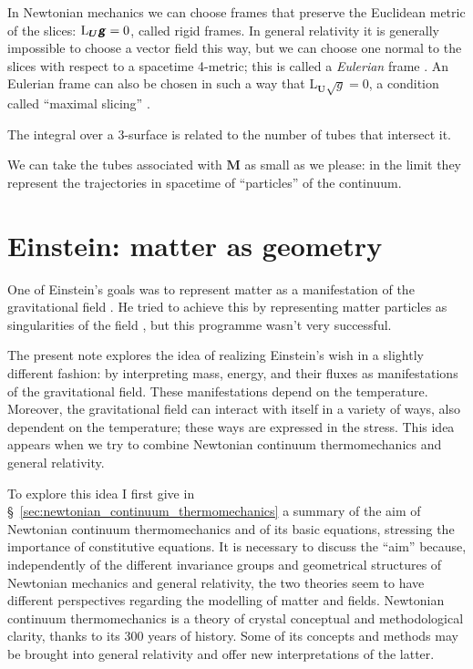 \documentclass[\ifafour a4paper,12pt,\else a5paper,10pt,\fi%
onecolumn,oneside,article,%
british%
]{memoir}
\theoremstyle{remark}
\theoremstyle{innote}
\newcommand*{\mathte}[1]{\textbf{\textit{\textsf{#1}}}}
\newcommand*{\citep}{\parencites}
\renewcommand*{\|}{\nonscript\,\vert\nonscript\;\mathopen{}}
\newcommand*{\sect}{\S}%
\newcommand*{\Li}{\mathrm{L}}
\newcommand*{\yrr}{M}
\newcommand*{\yr}{\bm{\yrr}}
\newcommand*{\yFF}{U}
\newcommand*{\yF}{\bm{\yFF}}
\newcommand*{\ygg}{g}
\newcommand*{\yg}{\mathte{\ygg}}
\newcommand*{\ygv}{\sqrt{\ygg}}
\begin{document}
\bigskip

In Newtonian mechanics we can choose frames that preserve the Euclidean
metric of the slices: $\Li_{\yF}\yg = 0$, called rigid frames. In general
relativity it is generally impossible to choose a vector field this way,
but we can choose one normal to the slices with respect to a spacetime
4-metric; this is called a \emph{Eulerian} frame
\citep{smarretal1978,smarretal1980}. An Eulerian frame can also be chosen in
such a way that $\Li_{\yF}\ygv=0$, a condition called \enquote{maximal
  slicing} \citep[\sect~III.B]{smarretal1978}.

The integral over a 3-surface is related
to the number of tubes that intersect it.

We can take the tubes associated with $\yr$ as small as we please: in the
limit they represent the trajectories in spacetime of \enquote{particles}
of the continuum.


\section{Einstein: matter as geometry}
\label{sec:einstein_matter_fields}

One of Einstein's goals was to represent matter as a manifestation of the
gravitational field \citep[see][]{havasetal1962,havas1967}. He tried to
achieve this by representing matter particles as singularities of the field
\citep{einsteinetal1938}, but this programme wasn't very successful.

The present note explores the idea of realizing Einstein's wish in a
slightly different fashion: by interpreting mass, energy, and their fluxes
as manifestations of the gravitational field. These manifestations depend
on the temperature. Moreover, the gravitational field can interact with
itself in a variety of ways, also dependent on the temperature; these ways
are expressed in the stress. This idea appears when we try to combine
Newtonian continuum thermomechanics and general relativity.

To explore this idea I first give in
\sect~\ref{sec:newtonian_continuum_thermomechanics} a summary of the aim of
Newtonian continuum thermomechanics and of its basic equations, stressing
the importance of constitutive equations. It is necessary to discuss the
\enquote{aim} because, independently of the different invariance groups and
geometrical structures of Newtonian mechanics and general relativity, the
two theories seem to have different perspectives regarding the modelling of
matter and fields. Newtonian continuum thermomechanics is a theory of
crystal conceptual and methodological clarity, thanks to its 300 years of
history. Some of its concepts and methods may be brought into general
relativity and offer new interpretations of the latter.
\end{document}
